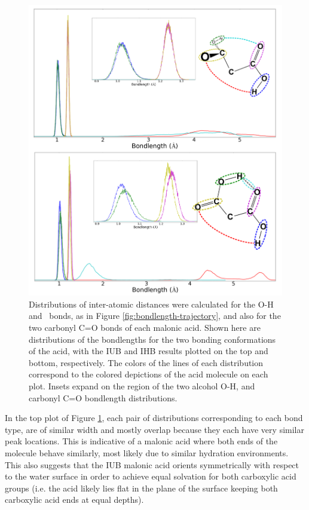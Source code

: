 \begin{figure}[h!]
	\begin{center}
		\includegraphics[scale=1.0]{images/bond-length/BondLengthDistros.png}
		\caption{Distributions of inter-atomic distances were calculated for the O-H and \ocarbh~bonds, as in Figure \ref{fig:bondlength-trajectory}, and also for the two carbonyl C=O bonds of each malonic acid. Shown here are distributions of the bondlengths for the two bonding conformations of the acid, with the IUB and IHB results plotted on the top and bottom, respectively. The colors of the lines of each distribution correspond to the colored depictions of the acid molecule on each plot. Insets expand on the region of the two alcohol O-H, and carbonyl C=O bondlength distributions.}
		\label{fig:bondlength-distribution}
	\end{center}
\end{figure}

In the top plot of Figure \ref{fig:bondlength-distribution}, each pair of distributions corresponding to each bond type, are of similar width and mostly overlap because they each have very similar peak locations. This is indicative of a malonic acid where both ends of the molecule behave similarly, most likely due to similar hydration environments. This also suggests that the IUB malonic acid orients symmetrically with respect to the water surface in order to achieve equal solvation for both carboxylic acid groups (i.e. the acid likely lies flat in the plane of the surface keeping both carboxylic acid ends at equal depths). 

